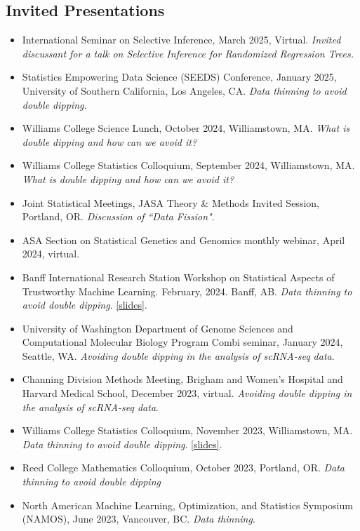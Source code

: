 \documentclass[margin, 10pt]{res}
\begin{document}
\begin{resume}
\section{Invited Presentations} 
\begin{itemize}
\item International Seminar on Selective Inference, March 2025, Virtual. \emph{Invited discussant for a talk on Selective Inference for Randomized Regression Trees.} 
\item Statistics Empowering Data Science (SEEDS) Conference, January 2025, University of Southern California, Los Angeles, CA. \emph{Data thinning to avoid double dipping.} 
\item Williams College Science Lunch, October 2024, Williamstown, MA. \emph{What is double dipping and how can we avoid it?}
\item Williams College Statistics Colloquium, September 2024, Williamstown, MA. \emph{What is double dipping and how can we avoid it?}
\item Joint Statistical Meetings, JASA Theory \& Methods Invited Session, Portland, OR. \emph{Discussion of ``Data Fission"}. 
\item ASA Section on Statistical Genetics and Genomics monthly webinar, April 2024, virtual. \item Banff International Research Station Workshop on Statistical Aspects of Trustworthy Machine Learning. February, 2024. Banff, AB. \emph{Data thinning to avoid double dipping}. \href{https://anna-neufeld.github.io/slides/BIRS.pdf}{[slides]}. 
\item University of Washington Department of Genome Sciences and Computational Molecular Biology Program Combi seminar, January 2024, Seattle, WA. \emph{Avoiding double dipping in the analysis of scRNA-seq data}.
\item Channing Division Methods Meeting, Brigham and Women's Hospital and Harvard Medical School, December 2023, virtual. \emph{Avoiding double dipping in the analysis of scRNA-seq data}.
\item Williams College Statistics Colloquium, November 2023, Williamstown, MA. \emph{Data thinning to avoid double dipping}. \href{https://anna-neufeld.github.io/slides/jobtalk.pdf}{[slides]}.
\item Reed College Mathematics Colloquium, October 2023, Portland, OR. \emph{Data thinning to avoid double dipping}
\item North American Machine Learning, Optimization, and Statistics Symposium (NAMOS), June 2023, Vancouver, BC. \emph{Data thinning}. 

\end{itemize}
\end{resume}
\end{document}
